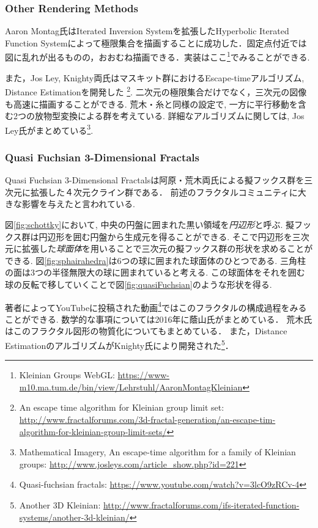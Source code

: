 \subsubsection{Other Rendering Methods}
Aaron Montag氏はIterated Inversion Systemを拡張したHyperbolic Iterated Function Systemによって極限集合を描画することに成功した\cite{hyperbolicIFS}．固定点付近では図に乱れが出るものの，おおむね描画できる．実装はここ\footnote{Kleinian Groups WebGL: \url{https://www-m10.ma.tum.de/bin/view/Lehrstuhl/AaronMontagKleinian}}でみることができる.

また，Jos Ley, Knighty両氏はマスキット群におけるEscape-timeアルゴリズム, Distance Estimationを開発した
\footnote{An escape time algorithm for Kleinian group limit set: \url{http://www.fractalforums.com/3d-fractal-generation/an-escape-tim-algorithm-for-kleinian-group-limit-sets/}}.
 二次元の極限集合だけでなく，三次元の図像も高速に描画することができる.
荒木・糸\cite{maskit}と同様の設定で, 一方に平行移動を含む2つの放物型変換による群を考えている.
詳細なアルゴリズムに関しては, Jos Ley氏がまとめている\footnote{Mathematical Imagery, An escape-time algorithm for a family of Kleinian groups: \url{http://www.josleys.com/article_show.php?id=221}}.

\subsubsection{Quasi Fuchsian 3-Dimensional Fractals}

Quasi Fuchsian 3-Dimensional Fractalsは阿原・荒木両氏による擬フックス群を三次元に拡張した４次元クライン群である\cite{sphairahedra}\cite{sphairahedraJa}．
前述のフラクタルコミュニティに大きな影響を与えたと言われている.

図\ref{fig:schottky}において, 中央の円盤に囲まれた黒い領域を\emph{円辺形}と呼ぶ.
擬フックス群は円辺形を囲む円盤から生成元を得ることができる.
そこで円辺形を三次元に拡張した\emph{球面体}を用いることで三次元の擬フックス群の形状を求めることができる.
図\ref{fig:sphairahedra}は6つの球に囲まれた球面体のひとつである.
三角柱の面は3つの半径無限大の球に囲まれていると考える.
この球面体をそれを囲む球の反転で移していくことで図\ref{fig:quasiFuchsian}のような形状を得る.

著者によってYouTubeに投稿された動画\footnote{Quasi-fuchsian fractals: \url{https://www.youtube.com/watch?v=3lcO9zRCv-4}}ではこのフラクタルの構成過程をみることができる.
数学的な事項については2016年に蔭山氏がまとめている\cite{kageyama}．
荒木氏はこのフラクタル図形の物質化についてもまとめている\cite{materializing}．
また，Distance EstimationのアルゴリズムがKnighty氏により開発された\footnote{Another 3D Kleinian: \url{http://www.fractalforums.com/ifs-iterated-function-systems/another-3d-kleinian/}}．

